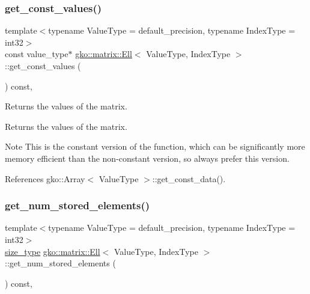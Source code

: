 \mbox{\label{classgko_1_1matrix_1_1Ell_a5bc4d3c67b328b353409e76eb9f70803}} 
\subsubsection{\texorpdfstring{get\+\_\+const\+\_\+values()}{get\_const\_values()}}
{\footnotesize\ttfamily template$<$typename Value\+Type = default\+\_\+precision, typename Index\+Type = int32$>$ \\
const value\+\_\+type$\ast$ \hyperlink{classgko_1_1matrix_1_1Ell}{gko\+::matrix\+::\+Ell}$<$ Value\+Type, Index\+Type $>$\+::get\+\_\+const\+\_\+values (\begin{DoxyParamCaption}{ }\end{DoxyParamCaption}) const\hspace{0.3cm}{\ttfamily [inline]}, {\ttfamily [noexcept]}}



Returns the values of the matrix. 

\begin{DoxyReturn}{Returns}
the values of the matrix.
\end{DoxyReturn}
\begin{DoxyNote}{Note}
This is the constant version of the function, which can be significantly more memory efficient than the non-\/constant version, so always prefer this version. 
\end{DoxyNote}


References gko\+::\+Array$<$ Value\+Type $>$\+::get\+\_\+const\+\_\+data().

\mbox{\label{classgko_1_1matrix_1_1Ell_aecca4e9cfb1e81958881c6dc3e2aa06f}} 
\subsubsection{\texorpdfstring{get\+\_\+num\+\_\+stored\+\_\+elements()}{get\_num\_stored\_elements()}}
{\footnotesize\ttfamily template$<$typename Value\+Type = default\+\_\+precision, typename Index\+Type = int32$>$ \\
\hyperlink{namespacegko_a6e5c95df0ae4e47aab2f604a22d98ee7}{size\+\_\+type} \hyperlink{classgko_1_1matrix_1_1Ell}{gko\+::matrix\+::\+Ell}$<$ Value\+Type, Index\+Type $>$\+::get\+\_\+num\+\_\+stored\+\_\+elements (\begin{DoxyParamCaption}{ }\end{DoxyParamCaption}) const\hspace{0.3cm}{\ttfamily [inline]}, {\ttfamily [noexcept]}}



